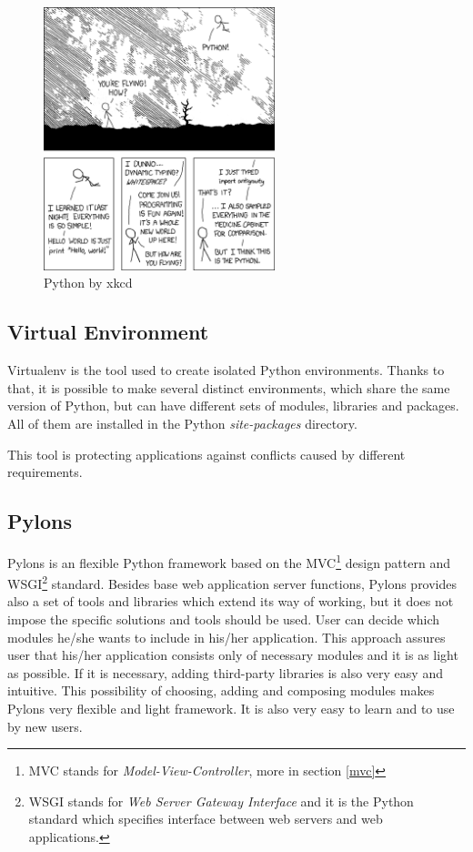 \begin{figure}[h!]
  \centering
  \includegraphics[width=0.6\textwidth]{reportCh2/python}
  \caption{Python by xkcd\cite{python_xkcd}}
  \label{fig:python}
\end{figure}

\subsection{Virtual Environment}
\label{virtualenv}
Virtualenv\cite{virtualenvlit} is the tool used to create isolated Python environments. Thanks to that, it is possible to make several distinct environments, which share the same version of Python, but can have different sets of modules, libraries and packages. All of them are installed in the Python \emph{site-packages} directory.

This tool is protecting applications against conflicts caused by different requirements.

\subsection{Pylons}
\label{pylons_descriptions}
Pylons \cite{pylons} is an flexible Python framework based on the MVC\footnote{MVC stands for \emph{Model-View-Controller}, more in section \ref{mvc}} design pattern and WSGI\footnote{WSGI\cite{wsgi} stands for \emph{Web Server Gateway Interface} and it is the Python standard which specifies interface between web servers and web applications.} standard. Besides base web application server functions, Pylons provides also a set of tools and libraries which extend its way of working, but it does not impose the specific solutions and tools should be used. User can decide which modules he/she wants to include in his/her application. This approach assures user that his/her application consists only of necessary modules and it is as light as possible. If it is necessary, adding third-party libraries is also very easy and intuitive. This possibility of choosing, adding and composing modules makes Pylons very flexible and light framework. It is also very easy to learn and to use by new users.

